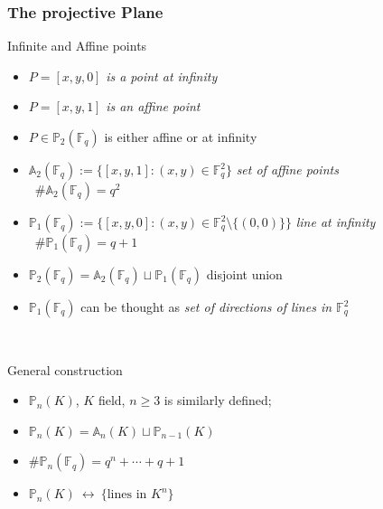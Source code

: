 \documentclass[10pt]{beamer} %
\newcommand{\F}{\mathbb F}
\theoremstyle{definition}
\begin{document}
\begin{frame}
\frametitle{The projective Plane}

\begin{beamerboxesrounded}[upper=block title example,lower=block body example,shadow=true]{Infinite and Affine points}
 \begin{itemize}[<+-| alert@+>]
\item $P=[x,y,0]$ \hfill \emph{is a point at infinity}
\item $P=[x,y,1]$ \hfill \emph{is an affine point}
\item $P\in\mathbb P_2(\F_q)$ is either affine or at infinity
\item $\mathbb A_2(\F_q):=\{[x,y,1]: (x,y)\in\F_q^2\}$ \hfill \emph{set of affine points}\\
\ \hfill\small{$\#\mathbb A_2(\F_q)=q^2$}
\item $\mathbb P_1(\F_q):=\{[x,y,0]: (x,y)\in\F_q^2\setminus\{(0,0)\}\}$ \hfill \emph{line at infinity}\\
\ \hfill\small{$\#\mathbb P_1(\F_q)=q+1$}
\item $\mathbb P_2(\F_q)=\mathbb A_2(\F_q)\sqcup\mathbb P_1(\F_q)$ \hfill  disjoint union
\item $\mathbb P_1(\F_q)$ can be thought as \emph{ set of directions of lines in $\F_q^2$}
\end{itemize}
\end{beamerboxesrounded}
\pause

\ \hfill
\begin{beamerboxesrounded}[upper=block title,lower=block body,shadow=true]{General construction}
  \begin{itemize}[<+-| alert@+>]
   \item $\mathbb P_n(K)$, $K$ field, $n\ge3$ is similarly defined;
   \item $\mathbb P_n(K)=\mathbb A_n(K)\sqcup\mathbb P_{n-1}(K)$
   \item $\#\mathbb P_n(\F_q)=q^n+\cdots+q+1$
   \item $\mathbb P_n(K)\ \longleftrightarrow\ \{\text{lines in }K^n\}$
  \end{itemize}
\end{beamerboxesrounded}
\end{frame}
\end{document}
